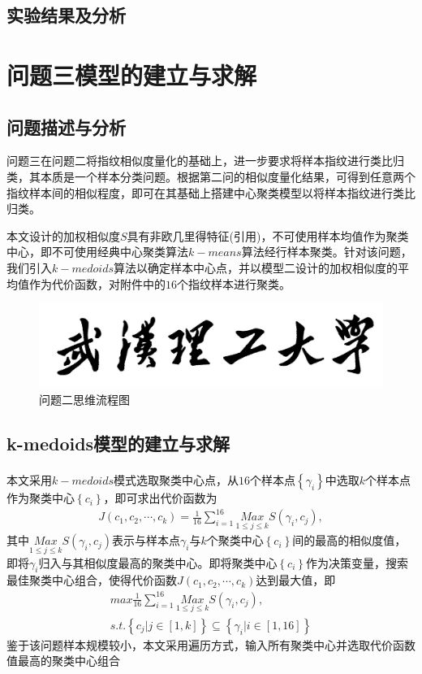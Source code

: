 \documentclass{whutmod}
\newcommand{\upcite}[1]{\textsuperscript{\cite{#1}}}
\begin{document}
\begin{itemize}
        \subsection{实验结果及分析}
        


    \section{问题三模型的建立与求解}

  	\subsection{问题描述与分析}
  	问题三在问题二将指纹相似度量化的基础上，进一步要求将样本指纹进行类比归类，其本质是一个样本分类问题。根据第二问的相似度量化结果，可得到任意两个指纹样本间的相似程度，即可在其基础上搭建中心聚类模型以将样本指纹进行类比归类。
  	
    本文设计的加权相似度$S$具有非欧几里得特征(引用)，不可使用样本均值作为聚类中心，即不可使用经典中心聚类算法$k-means$算法经行样本聚类。针对该问题，我们引入$k-medoids$算法以确定样本中心点，并以模型二设计的加权相似度的平均值作为代价函数，对附件中的$16$个指纹样本进行聚类。
  	
  	\begin{figure}[H]
  		\centering
  		\includegraphics[width=\textwidth]{figures/whut.jpg}
  		\caption{问题二思维流程图}\label{lsssscst}
  	\end{figure}
  	\subsection{k-medoids模型的建立与求解}
  	本文采用$k-medoids$模式选取聚类中心点\upcite{14,15}，从$16$个样本点$\left \{ \gamma_i  \right \}$中选取$k$个样本点作为聚类中心$\left \{ c_i \right \}$，即可求出代价函数为
  	\begin{gather}
  J(c_1,c_2,\cdots,c_k)=\frac{1}{16}\sum _{i=1}^{16}\underset{1\leqslant j\leqslant k}{Max}S(\gamma _i,c_j),
  	\end{gather}
  	其中$\underset{1\leqslant j\leqslant k}{Max}S(\gamma _i,c_j)$表示与样本点$ \gamma_i $与$k$个聚类中心$\left \{ c_i \right \}$间的最高的相似度值，即将$\gamma _i$归入与其相似度最高的聚类中心。即将聚类中心$\left \{ c_i \right \}$作为决策变量，搜索最佳聚类中心组合，使得代价函数$J(c_1,c_2,\cdots,c_k)$达到最大值，即
      	\begin{gather}
      max \frac{1}{16}\sum _{i=1}^{16}\underset{1\leqslant j\leqslant k}{Max}S(\gamma _i,c_j),\\
      s.t.\left \{  c_j  | j\in [1,k] \right \}  \subseteq  \left \{ \gamma _i | i\in [1,16]\right \} 
      \end{gather}
  	鉴于该问题样本规模较小，本文采用遍历方式，输入所有聚类中心并选取代价函数值最高的聚类中心组合

\end{itemize}
\end{document}
